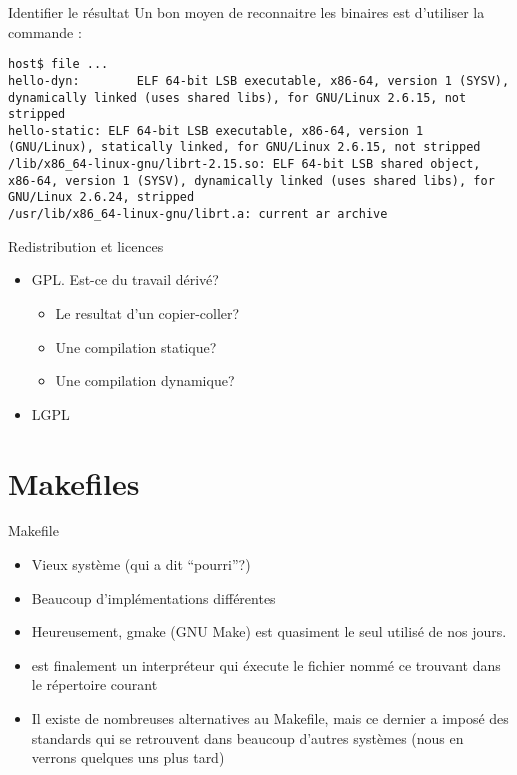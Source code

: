 \begin{frame}[fragile=singleslide]{Identifier le résultat}
  Un bon moyen de reconnaitre  les binaires est d'utiliser la commande
  :
  \begin{lstlisting}
host$ file ...
hello-dyn:        ELF 64-bit LSB executable, x86-64, version 1 (SYSV), dynamically linked (uses shared libs), for GNU/Linux 2.6.15, not stripped
hello-static: ELF 64-bit LSB executable, x86-64, version 1 (GNU/Linux), statically linked, for GNU/Linux 2.6.15, not stripped
/lib/x86_64-linux-gnu/librt-2.15.so: ELF 64-bit LSB shared object, x86-64, version 1 (SYSV), dynamically linked (uses shared libs), for GNU/Linux 2.6.24, stripped
/usr/lib/x86_64-linux-gnu/librt.a: current ar archive
\end{lstlisting} %
\end{frame}

\begin{frame}[fragile=singleslide]{Redistribution et licences}
  \begin{itemize}
  \item GPL. Est-ce du travail dérivé?
    \begin{itemize}
    \item Le resultat d'un copier-coller?
    \item Une compilation statique?
    \item Une compilation dynamique?
    \end{itemize}
  \item LGPL
  \end{itemize}
\end{frame}

\section{Makefiles}

\begin{frame}[fragile=singleslide]{Makefile}
  \begin{itemize} 
  \item Vieux système (qui a dit ``pourri''?)
  \item Beaucoup d'implémentations différentes
  \item Heureusement,  gmake (GNU Make) est quasiment  le seul utilisé
    de nos jours.
  \item  {}  est finalement  un  interpréteur  qui éxecute  le
    fichier  nommé    ce  trouvant dans  le  répertoire
    courant
  \item  Il existe  de nombreuses  alternatives au  Makefile,  mais ce
    dernier  a imposé des  standards qui  se retrouvent  dans beaucoup
    d'autres systèmes (nous en verrons quelques uns plus tard)
  \end{itemize} 
\end{frame} 

